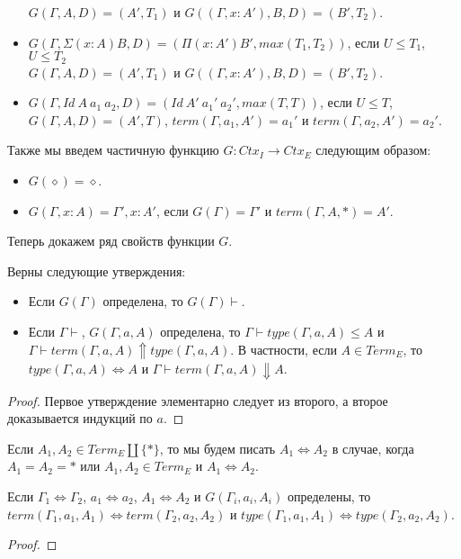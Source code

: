 \documentclass{amsart}
\theoremstyle{definition}
\theoremstyle{remark}
\newcommand{\deq}{\Leftrightarrow}
\numberwithin{figure}{section}
\begin{document}
\begin{itemize}
    $G(\Gamma, A, D) = (A', T_1)$ и $G((\Gamma, x : A'), B, D) = (B', T_2)$.
\item $G(\Gamma, \Sigma (x : A) B, D) = (\Pi (x : A') B', max(T_1, T_2))$, если $U \leq T_1$, $U \leq T_2$ \\
    $G(\Gamma, A, D) = (A', T_1)$ и $G((\Gamma, x : A'), B, D) = (B', T_2)$.
\item $G(\Gamma, Id\ A\ a_1\ a_2, D) = (Id\ A'\ a_1'\ a_2', max(T, T))$, если $U \leq T$, \\
    $G(\Gamma, A, D) = (A', T)$, $term(\Gamma, a_1, A') = a_1'$ и $term(\Gamma, a_2, A') = a_2'$.
\end{itemize}

Также мы введем частичную функцию $G : Ctx_I \to Ctx_E$ следующим образом:
\begin{itemize}
\item $G(\diamond) = \diamond$.
\item $G(\Gamma, x : A) = \Gamma', x : A'$, если $G(\Gamma) = \Gamma'$ и $term(\Gamma, A, *) = A'$.
\end{itemize}

Теперь докажем ряд свойств функции $G$.
\begin{lem}
Верны следующие утверждения:
\begin{itemize}
\item Если $G(\Gamma)$ определена, то $G(\Gamma) \vdash$.
\item Если $\Gamma \vdash$, $G(\Gamma, a, A)$ определена, то $\Gamma \vdash type(\Gamma, a, A) \leq A$ и \\ $\Gamma \vdash term(\Gamma, a, A) \Uparrow type(\Gamma, a, A)$.
    В частности, если $A \in Term_E$, то $type(\Gamma, a, A) \deq A$ и $\Gamma \vdash term(\Gamma, a, A) \Downarrow A$.
\end{itemize}
\end{lem}
\begin{proof}
Первое утверждение элементарно следует из второго, а второе доказывается индукций по $a$.
\end{proof}

Если $A_1, A_2 \in Term_E \amalg \{ * \}$, то мы будем писать $A_1 \deq A_2$ в случае, когда $A_1 = A_2 = *$ или $A_1, A_2 \in Term_E$ и $A_1 \deq A_2$.

\begin{lem}
Если $\Gamma_1 \deq \Gamma_2$, $a_1 \deq a_2$, $A_1 \deq A_2$ и $G(\Gamma_i, a_i, A_i)$ определены, то $term(\Gamma_1, a_1, A_1) \deq term(\Gamma_2, a_2, A_2)$ и $type(\Gamma_1, a_1, A_1) \deq type(\Gamma_2, a_2, A_2)$.
\end{lem}
\begin{proof}
\end{proof}
\end{document}
